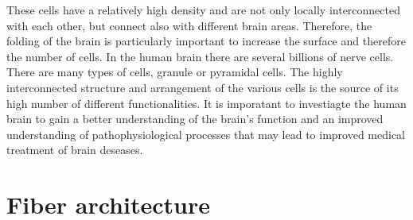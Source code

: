 These cells have a relatively high density and are not only locally interconnected with each other, but connect also with different brain areas.
Therefore, the folding of the brain is particularly important to increase the surface and therefore the number of cells.
In the human brain there are several billions of nerve cells.
There are many types of cells, \eg{} granule or pyramidal cells.
The highly interconnected structure and arrangement of the various cells is the source of its high number of different functionalities.
It is imporatant to investiagte the human brain to gain a better understanding of the brain's function and an improved understanding of pathophysiological processes that may lead to improved medical treatment of brain deseases.
%
%
%
\section{Fiber architecture} \label{sec:fiberArchitecture}
%
